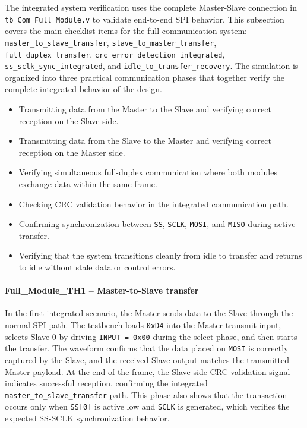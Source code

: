 \noindent The integrated system verification uses the complete Master-Slave connection in \texttt{tb\_Com\_Full\_Module.v} to validate end-to-end SPI behavior. This subsection covers the main checklist items for the full communication system: \texttt{master\_to\_slave\_transfer}, \texttt{slave\_to\_master\_transfer}, \texttt{full\_duplex\_transfer}, \texttt{crc\_error\_detection\_integrated}, \texttt{ss\_sclk\_sync\_integrated}, and \texttt{idle\_to\_transfer\_recovery}. The simulation is organized into three practical communication phases that together verify the complete integrated behavior of the design.

\begin{itemize}
    \item Transmitting data from the Master to the Slave and verifying correct reception on the Slave side.
    \item Transmitting data from the Slave to the Master and verifying correct reception on the Master side.
    \item Verifying simultaneous full-duplex communication where both modules exchange data within the same frame.
    \item Checking CRC validation behavior in the integrated communication path.
    \item Confirming synchronization between \texttt{SS}, \texttt{SCLK}, \texttt{MOSI}, and \texttt{MISO} during active transfer.
    \item Verifying that the system transitions cleanly from idle to transfer and returns to idle without stale data or control errors.
\end{itemize}

\paragraph{Full\_Module\_TH1 -- Master-to-Slave transfer}
In the first integrated scenario, the Master sends data to the Slave through the normal SPI path. The testbench loads \texttt{0xD4} into the Master transmit input, selects Slave 0 by driving \texttt{INPUT = 0x00} during the select phase, and then starts the transfer. The waveform confirms that the data placed on \texttt{MOSI} is correctly captured by the Slave, and the received Slave output matches the transmitted Master payload. At the end of the frame, the Slave-side CRC validation signal indicates successful reception, confirming the integrated \texttt{master\_to\_slave\_transfer} path. This phase also shows that the transaction occurs only when \texttt{SS[0]} is active low and \texttt{SCLK} is generated, which verifies the expected SS-SCLK synchronization behavior.

